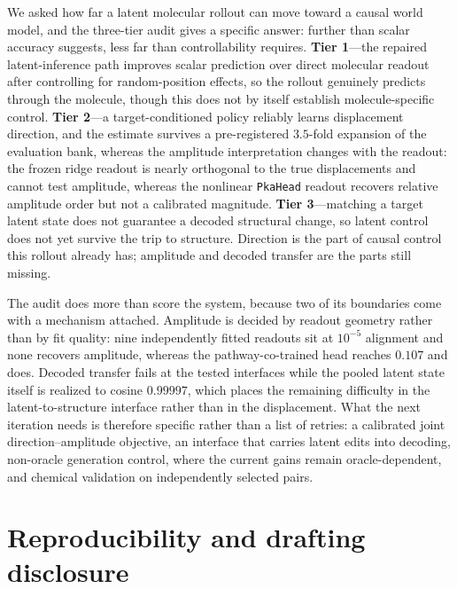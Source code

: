 \documentclass[11pt]{article}
\begin{document}
We asked how far a latent molecular rollout can move toward a causal world model, and the three-tier audit gives a specific answer: further than scalar accuracy suggests, less far than controllability requires. \textbf{Tier 1}---the repaired latent-inference path improves scalar prediction over direct molecular readout after controlling for random-position effects, so the rollout genuinely predicts through the molecule, though this does not by itself establish molecule-specific control. \textbf{Tier 2}---a target-conditioned policy reliably learns displacement direction, and the estimate survives a pre-registered $3.5$-fold expansion of the evaluation bank, whereas the amplitude interpretation changes with the readout: the frozen ridge readout is nearly orthogonal to the true displacements and cannot test amplitude, whereas the nonlinear \texttt{PkaHead} readout recovers relative amplitude order but not a calibrated magnitude. \textbf{Tier 3}---matching a target latent state does not guarantee a decoded structural change, so latent control does not yet survive the trip to structure. Direction is the part of causal control this rollout already has; amplitude and decoded transfer are the parts still missing.

The audit does more than score the system, because two of its boundaries come with a mechanism attached. Amplitude is decided by readout geometry rather than by fit quality: nine independently fitted readouts sit at $10^{-5}$ alignment and none recovers amplitude, whereas the pathway-co-trained head reaches $0.107$ and does. Decoded transfer fails at the tested interfaces while the pooled latent state itself is realized to cosine $0.99997$, which places the remaining difficulty in the latent-to-structure interface rather than in the displacement. What the next iteration needs is therefore specific rather than a list of retries: a calibrated joint direction--amplitude objective, an interface that carries latent edits into decoding, non-oracle generation control, where the current gains remain oracle-dependent, and chemical validation on independently selected pairs.

\section*{Reproducibility and drafting disclosure}
\end{document}
